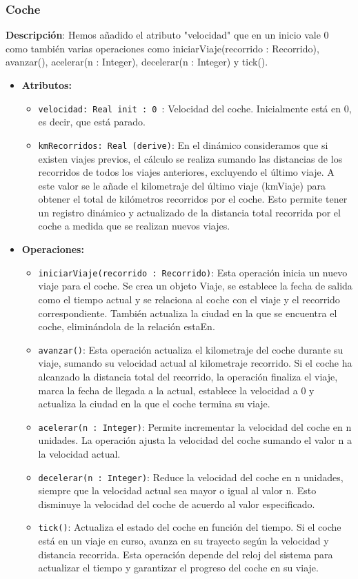 \documentclass[12pt.a4paper]{article}
\begin{document}
\subsubsection{Coche}
\textbf{Descripción}:  Hemos añadido el atributo "velocidad" que en un inicio vale 0 como también varias operaciones como iniciarViaje(recorrido : Recorrido), avanzar(), acelerar(n : Integer), decelerar(n : Integer) y tick().
\begin{itemize}
    \item \textbf{Atributos:}
    \begin{itemize}
        \item \texttt{velocidad: Real init : 0 }: Velocidad del coche. Inicialmente está en 0, es decir, que está parado.
        \item \texttt{kmRecorridos: Real (derive)}: En el dinámico consideramos que si existen viajes previos, el cálculo se realiza sumando las distancias de los recorridos de todos los viajes anteriores, excluyendo el último viaje. A este valor se le añade el kilometraje del último viaje (kmViaje) para obtener el total de kilómetros recorridos por el coche. Esto permite tener un registro dinámico y actualizado de la distancia total recorrida por el coche a medida que se realizan nuevos viajes.
    \end{itemize}
    \item \textbf{Operaciones:}
    \begin{itemize}
        \item \texttt{iniciarViaje(recorrido : Recorrido)}: Esta operación inicia un nuevo viaje para el coche. Se crea un objeto Viaje, se establece la fecha de salida como el tiempo actual y se relaciona al coche con el viaje y el recorrido correspondiente. También actualiza la ciudad en la que se encuentra el coche, eliminándola de la relación estaEn.
        \item \texttt{avanzar()}: Esta operación actualiza el kilometraje del coche durante su viaje, sumando su velocidad actual al kilometraje recorrido. Si el coche ha alcanzado la distancia total del recorrido, la operación finaliza el viaje, marca la fecha de llegada a la actual, establece la velocidad a 0 y actualiza la ciudad en la que el coche termina su viaje.
        \item \texttt{acelerar(n : Integer)}: Permite incrementar la velocidad del coche en n unidades. La operación ajusta la velocidad del coche sumando el valor n a la velocidad actual.
        \item \texttt{decelerar(n : Integer)}: Reduce la velocidad del coche en n unidades, siempre que la velocidad actual sea mayor o igual al valor n. Esto disminuye la velocidad del coche de acuerdo al valor especificado.
        \item \texttt{tick()}: Actualiza el estado del coche en función del tiempo. Si el coche está en un viaje en curso, avanza en su trayecto según la velocidad y distancia recorrida. Esta operación depende del reloj del sistema para actualizar el tiempo y garantizar el progreso del coche en su viaje.
    \end{itemize}
\end{itemize}
\end{document}
